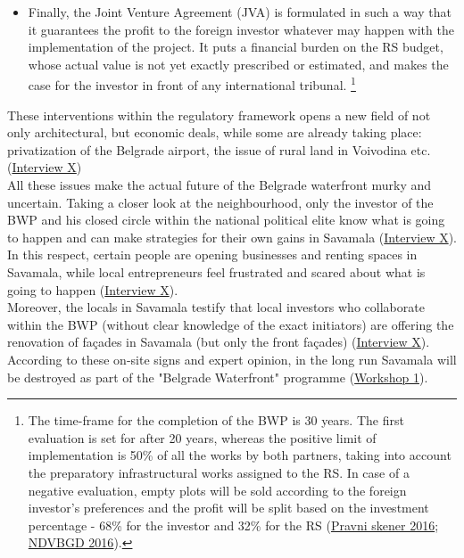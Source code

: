 \documentclass[11pt]{report}
\begin{document}
{{{\begin{itemize}
\item Finally, the Joint Venture Agreement (JVA) is formulated in such a way that it guarantees the profit to the foreign investor whatever may happen with the implementation of the project.
It puts a financial burden on the RS budget, whose actual value is not yet exactly prescribed or estimated, and makes the case for the investor in front of any international tribunal.
\footnote{The time-frame for the completion of the BWP is 30 years. The first evaluation is set for after 20 years, whereas the positive limit of implementation is 50\% of all the works by both partners, taking into account the preparatory infrastructural works assigned to the RS. In case of a negative evaluation, empty plots will be sold according to the foreign investor’s preferences and the profit  will be split based on the investment percentage - 68\% for the investor and 32\% for the RS (\href{Pravni skener}{Pravni skener 2016}; \href{NDVBGD}{NDVBGD 2016}).}

\end{itemize}

These interventions within the regulatory framework opens a new field of not only architectural, but economic deals, while some are already taking place: privatization of the Belgrade airport, the issue of rural land in Voivodina etc. 
(\href{InterviewX}{Interview X})
\\

All these issues make the actual future of the Belgrade waterfront murky and uncertain.
Taking a closer look at the neighbourhood, only the investor of the BWP and his closed circle within the national political elite know what is going to happen and can make strategies for their own gains in Savamala
(\href{InterviewX}{Interview X}).
In this respect, certain people are opening businesses and renting spaces in Savamala, while local entrepreneurs feel frustrated and scared about what is going to happen (\href{InterviewX}{Interview X}).
\\

Moreover, the locals in Savamala testify that local investors who collaborate within the BWP (without clear knowledge of the exact initiators) are offering the renovation of façades in Savamala (but only the front façades)
(\href{InterviewX}{Interview X}).
According to these on-site signs and expert opinion, in the long run Savamala will be destroyed as part of the "Belgrade Waterfront" programme
(\href{Expert Workshop}{Workshop 1}).
\\

}}}
\end{document}
